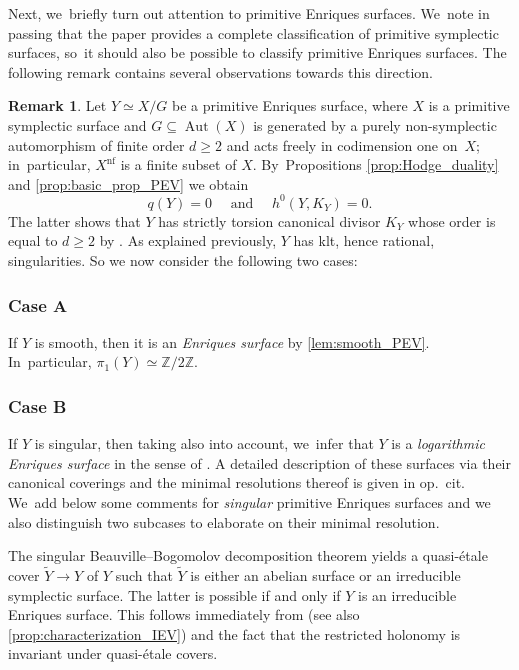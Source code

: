 \documentclass[10pt]{amsart}
\theoremstyle{plain}
\theoremstyle{definition}
\newtheorem{rem}[thm]{Remark}
\newcommand{\Z}{\mathbb{Z}}
\DeclareMathOperator{\Aut}{Aut}
\begin{document}
Next, we~briefly turn out attention to primitive Enriques surfaces. We~note in passing that the paper \cite{GPP24} provides a complete classification of primitive symplectic surfaces, so~it should also be possible to classify primitive Enriques surfaces. The following remark contains several observations towards this direction.

\begin{rem}
Let $Y \simeq X / G$ be a primitive Enriques surface,
where $X$ is a primitive symplectic surface and $G \subseteq \Aut(X)$ is generated by a purely non-symplectic automorphism of finite order $d \geq 2$ and acts freely in codimension one on~$X$; in~particular, $X^\mathrm{nf}$ is a finite subset of $X$. By~Propositions \ref{prop:Hodge_duality} and \ref{prop:basic_prop_PEV} we obtain
\[
q(Y) = 0 \quad \text{ and } \quad h^0(Y, K_Y) = 0.
\]
The latter shows that $Y$ has strictly torsion canonical divisor $K_Y$ whose order is equal to $d \geq 2$ by \cite[Prop.\,5.4]{BCS24}. As explained previously, $Y$ has klt, hence rational, singularities. So we now consider the following two cases:

\subsubsection*{Case A}
If $Y$ is smooth, then it is an \emph{Enriques surface} by \autoref{lem:smooth_PEV}. In~particular, $\pi_1(Y) \simeq \Z / 2\Z$.

\subsubsection*{Case B}
If $Y$ is singular, then taking \cite[Prop.\,4.18, Th.\,4.20 \& Rem.\,4.21(1)]{KM98} also into account, we~infer that $Y$ is a \emph{logarithmic Enriques surface} in the sense of \cite{Zhang91,Zhang93}.
A detailed description of these surfaces via their canonical coverings and the minimal resolutions thereof is given in op.\ cit. We~add below some comments for \emph{singular} primitive Enriques surfaces and we also distinguish two subcases to elaborate on their minimal resolution.

The singular Beauville--Bogomolov decomposition theorem \cite[Th.\,1.5]{HoerPet19} yields a quasi-étale cover $\widetilde{Y} \to Y$ of $Y$ such that $\widetilde{Y}$ is either an abelian surface or an irreducible symplectic surface. The latter is possible if and only if $Y$ is an irreducible Enriques surface. This follows immediately from \cite[Prop.\,F, (F.4)--(F.6)]{GGK19} (see also \autoref{prop:characterization_IEV}) and the fact \cite[Lem.\,4.7]{GGK19} that the restricted holonomy is invariant under quasi-étale covers.


\end{rem}
\end{document}
